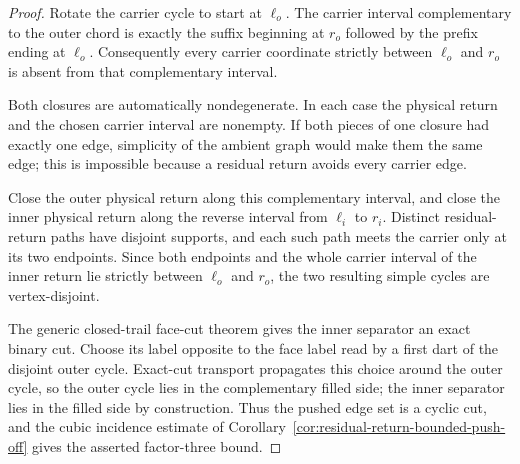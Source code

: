 \begin{proof}
Rotate the carrier cycle to start at $\ell_o$.  The carrier interval
complementary to the outer chord is exactly the suffix beginning at $r_o$
followed by the prefix ending at $\ell_o$.  Consequently every carrier
coordinate strictly between $\ell_o$ and $r_o$ is absent from that
complementary interval.

Both closures are automatically nondegenerate.  In each case the physical
return and the chosen carrier interval are nonempty.  If both pieces of one
closure had exactly one edge, simplicity of the ambient graph would make
them the same edge; this is impossible because a residual return avoids
every carrier edge.

Close the outer physical return along this complementary interval, and close
the inner physical return along the reverse interval from $\ell_i$ to $r_i$.
Distinct residual-return paths have disjoint supports, and each such path
meets the carrier only at its two endpoints.  Since both endpoints and the
whole carrier interval of the inner return lie strictly between
$\ell_o$ and $r_o$, the two resulting simple cycles are vertex-disjoint.

The generic closed-trail face-cut theorem gives the inner separator an exact
binary cut.  Choose its label opposite to the face label read by a first dart
of the disjoint outer cycle.  Exact-cut transport propagates this choice
around the outer cycle, so the outer cycle lies in the complementary filled
side; the inner separator lies in the filled side by construction.  Thus the
pushed edge set is a cyclic cut, and the cubic incidence estimate of
Corollary~\ref{cor:residual-return-bounded-push-off} gives the asserted
factor-three bound.
\end{proof}

